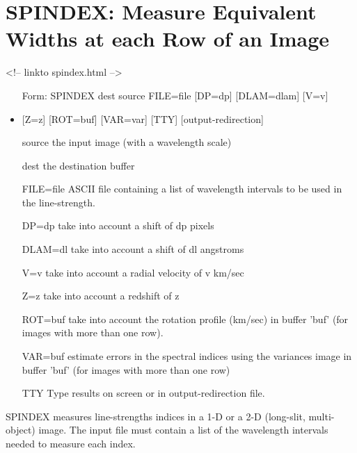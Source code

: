 \section{SPINDEX: Measure Equivalent Widths at each Row of an Image}
\begin{rawhtml}
<!-- linkto spindex.html -->
\end{rawhtml}
\begin{itemize}
  \item[Form: SPINDEX dest source FILE=file {[DP=dp]} {[DLAM=dlam]} 
       {[V=v]}\hfill]{}
  \item{{[Z=z]} {[ROT=buf]} {[VAR=var]} {[TTY]} {[output-redirection]}}
  \item[source]{the input image (with a wavelength scale)}
  \item[dest]{the destination buffer}
  \item[FILE=file]{ASCII file containing a list of wavelength intervals
       to be used in the line-strength.}
  \item[DP=dp]{take into account a shift of dp pixels}
  \item[DLAM=dl]{take into account a shift of dl angstroms}
  \item[V=v]{take into account a radial velocity of v km/sec}
  \item[Z=z]{take into account a redshift of z}
  \item[ROT=buf]{take into account the rotation profile (km/sec)
       in buffer 'buf' (for images with more than one row).}
  \item[VAR=buf]{estimate errors in the spectral indices using the
       variances image in buffer 'buf' (for images with more
       than one row)}
  \item[TTY]{Type results on screen or in output-redirection file.}
\end{itemize}

SPINDEX measures line-strengths indices in a 1-D or a 2-D (long-slit,
multi-object) image. The input file must contain a list of the wavelength
intervals needed to measure each index. 

